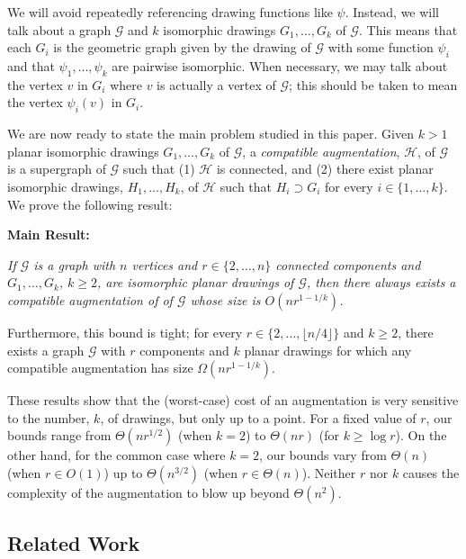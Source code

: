 \documentclass[11pt]{patmorin}
\begin{document}
We will avoid repeatedly referencing drawing
functions like $\psi$.  Instead, we will talk about a graph $\mathcal{G}$
and $k$ isomorphic drawings $G_1,\ldots,G_k$ of $\mathcal G$.  This
means that each $G_i$ is the geometric graph given by the drawing of
$\mathcal{G}$ with some function $\psi_i$ and that $\psi_1,\ldots,\psi_k$
are pairwise isomorphic.  When necessary, we may talk about the vertex $v$
in $G_i$ where $v$ is actually a vertex of $\mathcal{G}$; this should
be taken to mean the vertex $\psi_i(v)$ in $G_i$.  

We are now ready to state the main problem studied in this paper.
Given $k>1$ planar isomorphic drawings $G_1, \ldots, G_k$
of $\mathcal G$, a \emph{compatible augmentation}, $\mathcal H$, of
$\mathcal G$ is a supergraph of $\mathcal G$ such that (1) $\mathcal H$
is connected, and (2) there exist planar isomorphic drawings,
$H_1, \ldots, H_k$, of $\mathcal H$ such that $H_i\supset G_i$ for every
$i\in\{1,\ldots,k\}$.  We prove the following result:

\noindent\textbf{Main Result:} {\itshape If $\mathcal{G}$ is a graph
with $n$ vertices and $r\in\{2,\ldots,n\}$ connected components and
$G_1,\ldots,G_k$, $k\ge 2$, are isomorphic planar drawings of $\mathcal
G$, then there always exists a compatible augmentation of of $\mathcal G$
whose size is $O(nr^{1-1/k})$.

Furthermore, this bound is tight; for every $r\in\{2,\ldots,\lfloor n/4\rfloor\}$ and $k\ge 2$, there exists a graph $\mathcal G$
with $r$ components and $k$ planar drawings for which any compatible
augmentation has size $\Omega(nr^{1-1/k})$.}

These results show that the (worst-case) cost of an augmentation is very
sensitive to the number, $k$, of drawings, but only up to a point.
For a fixed value of $r$, our bounds range from $\Theta(nr^{1/2})$ (when
$k=2$) to $\Theta(nr)$ (for $k\ge \log r$).  On the other hand, for the
common case where $k=2$, our bounds vary from $\Theta(n)$ (when $r\in
O(1)$) up to $\Theta(n^{3/2})$ (when $r\in\Theta(n)$).  Neither $r$ nor $k$
causes the complexity of the augmentation to blow up beyond $\Theta(n^2)$.

\subsection{Related Work}
\end{document}

